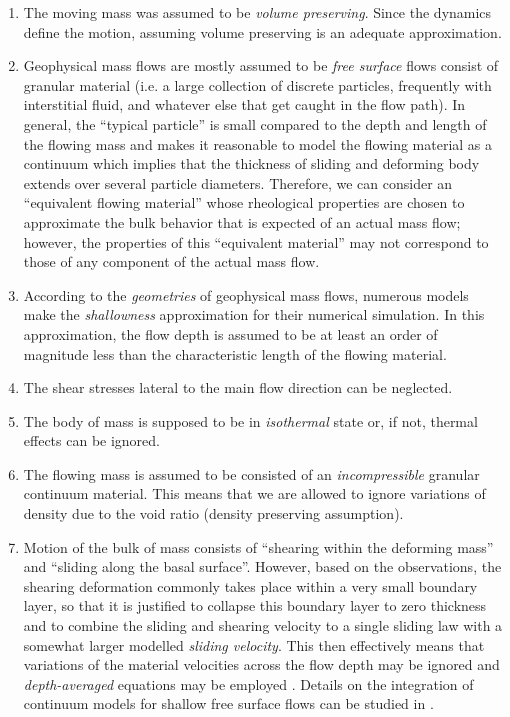 \documentclass{article}
\begin{document}
\begin{enumerate}
\item The moving mass was assumed to be \textit{volume preserving}. Since the dynamics define the motion, assuming volume preserving is an adequate approximation.
\item Geophysical mass flows are mostly assumed to be \textit{free surface} flows consist of granular material (i.e. a large collection of discrete particles, frequently with interstitial fluid, and whatever else that get caught in the flow path). In general, the ``typical particle'' is small compared to the depth and length of the flowing mass and makes it reasonable to model the flowing material as a continuum which implies that the thickness of sliding and deforming body extends over several particle diameters. Therefore, we can consider an ``equivalent flowing material'' whose rheological properties are chosen to approximate the bulk behavior that is expected of an actual mass flow; however, the properties of this ``equivalent material'' may not correspond to those of any component of the actual mass flow.
\item According to the \textit{geometries} of geophysical mass flows, numerous models make the \textit{shallowness} approximation for their numerical simulation. In this approximation, the flow depth is assumed to be at least an order of magnitude less than the characteristic length of the flowing material.
\item The shear stresses lateral to the main flow direction can be neglected.
\item The body of mass is supposed to be in \textit{isothermal} state or, if not, thermal effects can be ignored.
\item The flowing mass is assumed to be consisted of an \textit{incompressible} granular continuum material. This means that we are allowed to ignore variations of density due to the void ratio (density preserving assumption).
\item Motion of the bulk of mass consists of ``shearing within the deforming mass'' and ``sliding along the basal surface''. However, based on the observations, the shearing deformation commonly takes place within a very small boundary layer, so that it is justified to collapse this boundary layer to zero thickness and to combine the sliding and shearing velocity to a single sliding law with a somewhat larger modelled \textit{sliding velocity}. This then effectively means that variations of the material velocities across the flow depth may be ignored and \textit{depth-averaged} equations may be employed \citep{SavageHutter,Hutter1993}. Details on the integration of continuum models for shallow free surface flows can be studied in \citep{PudasainiHutter2007}.%

\end{enumerate}
\end{document}
